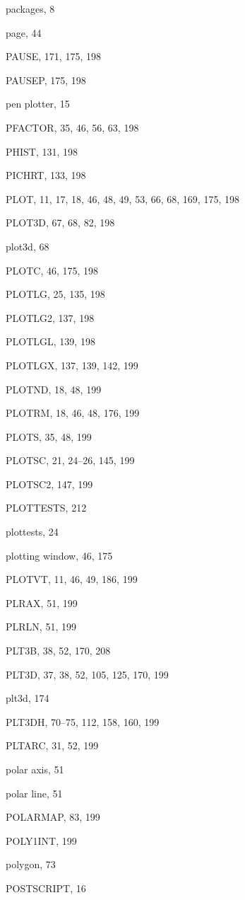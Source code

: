 \begin{theindex}
  \indexspace

  \item packages, 8
  \item page, 44
  \item PAUSE, 171, 175, 198
  \item PAUSEP, 175, 198
  \item pen plotter, 15
  \item PFACTOR, 35, 46, 56, 63, 198
  \item PHIST, 131, 198
  \item PICHRT, 133, 198
  \item PLOT, 11, 17, 18, 46, 48, 49, 53, 66, 68, 169, 175, 198
  \item PLOT3D, 67, 68, 82, 198
  \item plot3d, 68
  \item PLOTC, 46, 175, 198
  \item PLOTLG, 25, 135, 198
  \item PLOTLG2, 137, 198
  \item PLOTLGL, 139, 198
  \item PLOTLGX, 137, 139, 142, 199
  \item PLOTND, 18, 48, 199
  \item PLOTRM, 18, 46, 48, 176, 199
  \item PLOTS, 35, 48, 199
  \item PLOTSC, 21, 24--26, 145, 199
  \item PLOTSC2, 147, 199
  \item PLOTTESTS, 212
  \item plottests, 24
  \item plotting window, 46, 175
  \item PLOTVT, 11, 46, 49, 186, 199
  \item PLRAX, 51, 199
  \item PLRLN, 51, 199
  \item PLT3B, 38, 52, 170, 208
  \item PLT3D, 37, 38, 52, 105, 125, 170, 199
  \item plt3d, 174
  \item PLT3DH, 70--75, 112, 158, 160, 199
  \item PLTARC, 31, 52, 199
  \item polar axis, 51
  \item polar line, 51
  \item POLARMAP, 83, 199
  \item POLY1INT, 199
  \item polygon, 73
  \item POSTSCRIPT, 16

\end{theindex}
